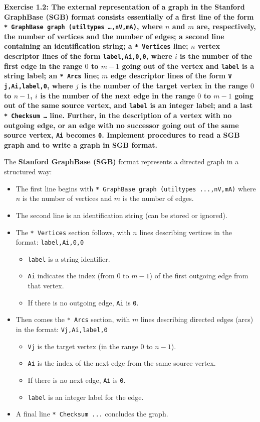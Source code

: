 \documentclass{article}
\begin{document}
\textbf{Exercise 1.2: The external representation of a graph in the Stanford GraphBase (SGB) format consists essentially of a first line of the form \texttt{* GraphBase graph (utiltypes …,nV,mA)}, where $n$ and $m$ are, respectively, the number of vertices and the number of edges; a second line containing an identification string; a \texttt{* Vertices} line; $n$ vertex descriptor lines of the form \texttt{label,Ai,0,0}, where $i$ is the number of the first edge in the range $0$ to $m - 1$ going out of the vertex and \texttt{label} is a string label; an \texttt{* Arcs} line; $m$ edge descriptor lines of the form \texttt{V j,Ai,label,0}, where $j$ is the number of the target vertex in the range $0$ to $n - 1$, $i$ is the number of the next edge in the range $0$ to $m - 1$ going out of the same source vertex, and \texttt{label} is an integer label; and a last \texttt{* Checksum …} line. Further, in the description of a vertex with no outgoing edge, or an edge with no successor going out of the same source vertex, \texttt{Ai} becomes \texttt{0}. Implement procedures to read a SGB graph and to write a graph in SGB format.}

The \textbf{Stanford GraphBase (SGB)} format represents a directed graph in a structured way:

\begin{itemize}
    \item The first line begins with \texttt{* GraphBase graph (utiltypes ...,nV,mA)} where $n$ is the number of vertices and $m$ is the number of edges.
    \item The second line is an identification string (can be stored or ignored).
    \item The \texttt{* Vertices} section follows, with $n$ lines describing vertices in the format: \texttt{label,Ai,0,0}
    \begin{itemize}
        \item \texttt{label} is a string identifier.
        \item \texttt{Ai} indicates the index (from $0$ to $m-1$) of the first outgoing edge from that vertex.
        \item If there is no outgoing edge, \texttt{Ai} is \texttt{0}.
    \end{itemize}
    \item Then comes the \texttt{* Arcs} section, with $m$ lines describing directed edges (arcs) in the format: \texttt{Vj,Ai,label,0}
    \begin{itemize}
        \item \texttt{Vj} is the target vertex (in the range $0$ to $n-1$).
        \item \texttt{Ai} is the index of the next edge from the same source vertex.
        \item If there is no next edge, \texttt{Ai} is \texttt{0}.
        \item \texttt{label} is an integer label for the edge.
    \end{itemize}
    \item A final line \texttt{* Checksum ...} concludes the graph.
\end{itemize}
\end{document}
